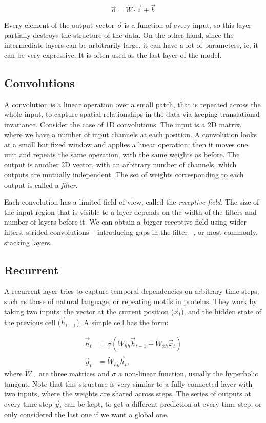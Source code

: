 \begin{equation*}
\vec{o} = \widetilde W \cdot \vec{i} + \vec{b}
\end{equation*}

Every element of the output vector $\vec o$ is a function of every input, so this layer partially destroys the structure of the data.
On the other hand, since the intermediate layers can be arbitrarily large, it can have a lot of parameters, ie, it can be very expressive.
It is often used as the last layer of the model.

\subsection{Convolutions}
A convolution is a linear operation over a small patch, that is repeated across the whole input, to  capture spatial relationships in the data via keeping translational invariance.
Consider the case of 1D convolutions.
The input is a 2D matrix, where we have a number of input channels at each position.
A convolution looks at a small but fixed window and applies a linear operation; then it moves one unit and repeats the same operation, with the same weights as before.
The output is another 2D vector, with an arbitrary number of channels, which outputs are mutually independent.
The set of weights corresponding to each output is called a \emph{filter}.

Each convolution has a limited field of view, called the \emph{receptive field}. 
The size of the input region 
that is visible to a layer depends on the width of the filters and number of layers before it.
We can obtain a bigger receptive field using wider filters, strided convolutions -- introducing gaps in the filter --, or most commonly, stacking layers.
 

\subsection{Recurrent}
A recurrent layer tries to capture temporal dependencies on arbitrary time steps, such as those of natural language, or repeating motifs in proteins.
They work by taking two inputs: the vector at the current position ($\vec x_t$), and the hidden state of the previous cell ($\vec h_{t-1}$).
A simple cell has the form:

\begin{align*}
\vec h_t &= \sigma\left(\widetilde W_{hh} \vec{h}_{t-1} + \widetilde W_{xh} \vec{x}_{t}\right) \\
\vec y_t &=  \widetilde W_{hy} \vec h_t,
\end{align*}
where $ \widetilde W_{\cdot \cdot}$ are three matrices and $\sigma$ a non-linear function, usually the hyperbolic tangent.
Note that this structure is very similar to a fully connected layer with two inputs, where the weights are shared across steps.
The series of outputs at every time step $\vec y_t$ can be kept, to get a different prediction at every time step, or only considered the last one if we want a global one.

